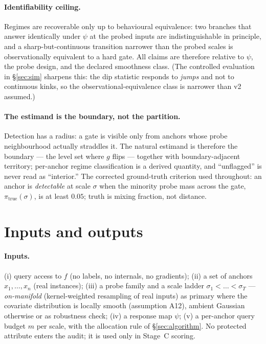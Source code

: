\documentclass[11pt]{article}
\begin{document}
\paragraph{Identifiability ceiling.} Regimes are recoverable only up to behavioural
equivalence: two branches that answer identically under $\psi$ at the probed inputs are
indistinguishable in principle, and a sharp-but-continuous transition narrower than the
probed scales is observationally equivalent to a hard gate. All claims are therefore relative
to $\psi$, the probe design, and the declared smoothness class. (The controlled evaluation in
\S\ref{sec:sim} sharpens this: the dip statistic responds to \emph{jumps} and not to
continuous kinks, so the observational-equivalence class is narrower than v2 assumed.)

\paragraph{The estimand is the boundary, not the partition.} Detection has a radius: a gate
is visible only from anchors whose probe neighbourhood actually straddles it. The natural
estimand is therefore the boundary --- the level set where $g$ flips --- together with
boundary-adjacent territory; per-anchor regime classification is a derived quantity, and
``unflagged'' is never read as ``interior.'' The corrected ground-truth criterion used
throughout: an anchor is \emph{detectable} at scale $\sigma$ when the minority probe mass
across the gate, $\pi_{\mathrm{true}}(\sigma)$, is at least $0.05$; truth is mixing fraction,
not distance.

\section{Inputs and outputs}
\label{sec:io}

\paragraph{Inputs.}
(i) query access to $f$ (no labels, no internals, no gradients);
(ii) a set of anchors $x_1,\dots,x_n$ (real instances);
(iii) a probe family and a scale ladder $\sigma_1<\dots<\sigma_T$ --- \emph{on-manifold}
(kernel-weighted resampling of real inputs) as primary where the covariate distribution is
locally smooth (assumption A12), ambient Gaussian otherwise or as robustness check;
(iv) a response map $\psi$;
(v) a per-anchor query budget $m$ per scale, with the allocation rule of
\S\ref{sec:algorithm}.
No protected attribute enters the audit; it is used only in Stage~C scoring.
\end{document}
